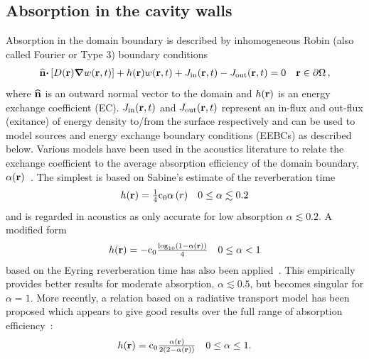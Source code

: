 \documentclass[a4paper]{article}
\numberwithin{equation}{section}
\begin{document}
\subsection[Absorption in the cavity walls]{Absorption in the cavity walls}
\label{sc:sum:abs}

Absorption in the domain boundary is described by inhomogeneous Robin (also
called Fourier or Type 3) boundary conditions
\begin{align}
\begin{matrix}
\widehat{\boldsymbol{\mathrm{n}}}\boldsymbol{\mathrm{\cdot}}\left[D(\boldsymbol{\mathrm{r}})\boldsymbol{\mathrm{\nabla}} w(\boldsymbol{\mathrm{r}},t)\right] + h(\boldsymbol{\mathrm{r}}) w(\boldsymbol{\mathrm{r}},t) + J_\mathrm{in}(\boldsymbol{\mathrm{r}},t) - J_\mathrm{out}(\boldsymbol{\mathrm{r}},t) = 0 &\boldsymbol{\mathrm{r}}\in\partial\Omega\,,
\end{matrix}
\end{align}
where $\widehat{\boldsymbol{\mathrm{n}}}$ is an outward normal vector to the domain and 
$h(\boldsymbol{\mathrm{r}})$ is an energy exchange coefficient (EC). $J_\mathrm{in}(\boldsymbol{\mathrm{r}},t)$ and
$J_\mathrm{out}(\boldsymbol{\mathrm{r}},t)$ represent an in-flux and out-flux (exitance) of energy density to/from the surface 
respectively and can be used to model sources and energy exchange boundary conditions (EEBCs) as described below.
Various models have been used in the acoustics literature to relate the exchange coefficient to the
average absorption efficiency of the domain boundary, $\alpha(\boldsymbol{\mathrm{r}})$~\citep{Jing2008,Xiang2009}. The
simplest is based on Sabine's estimate of the reverberation time~\citep{Sabine1922}
\begin{align}
\label{eq:ecsabine}
\begin{matrix}
h(\boldsymbol{\mathrm{r}}) = \frac{1}{4}\mathrm{c}_0\alpha \left(r\right)&0\leq\alpha\lesssim 0.2
\end{matrix}
\end{align}
and is regarded in acoustics as only accurate for low absorption $\alpha\lesssim 0.2$. 
A modified form
\begin{align}
\begin{matrix}
h(\boldsymbol{\mathrm{r}}) = -\mathrm{c}_0\frac{\log_{10}\left(1-\alpha(\boldsymbol{\mathrm{r}})\right)}{4} &0\leq\alpha< 1
\end{matrix}
\end{align}
based on the Eyring reverberation time has also been applied~\citep{Eyring1930}.
This empirically provides better results for moderate absorption, $\alpha\lesssim 0.5$, 
but becomes singular for $\alpha=1$. More recently, a relation based on
a radiative transport model has been proposed which appears to give good
results over the full range of absorption efficiency~\citep{Jing2008}:
\begin{align}
\label{eq:ecjing}
\begin{matrix}
h(\boldsymbol{\mathrm{r}}) =\mathrm{c}_0\frac{\alpha(\boldsymbol{\mathrm{r}})}{2\left(2-\alpha(\boldsymbol{\mathrm{r}})\right)} & 0\leq\alpha\leq 1 .
\end{matrix}
\end{align}
\end{document}
